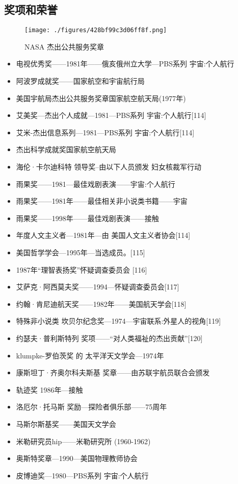 \subsection{奖项和荣誉}
\begin{figure}[ht]
\centering
\texttt{[image: ./figures/428bf99c3d06ff8f.png]}
\caption{NASA 杰出公共服务奖章} \label{fig_Sagan_11}
\end{figure}
\begin{itemize}
\item 电视优秀奖——1981年——俄亥俄州立大学—PBS系列 宇宙:个人航行
\item 阿波罗成就奖——国家航空和宇宙航行局
\item 美国宇航局杰出公共服务奖章国家航空航天局(1977年)
\item 艾美奖—杰出个人成就—1981—PBS系列 宇宙:个人航行[114]
\item 艾米-杰出信息系列—1981—PBS系列 宇宙:个人航行[114]
\item 杰出科学成就奖国家航空航天局
\item 海伦·卡尔迪科特 领导奖–由以下人员颁发 妇女核裁军行动
\item 雨果奖——1981—最佳戏剧表演——宇宙:个人航行
\item 雨果奖——1981年——最佳相关非小说类书籍——宇宙
\item 雨果奖——1998年——最佳戏剧表演——接触
\item 年度人文主义者—1981年—由 美国人文主义者协会[114]
\item 美国哲学学会—1995年—当选成员。[115]
\item 1987年“理智表扬奖”怀疑调查委员会 [116]
\item 艾萨克·阿西莫夫奖——1994—怀疑调查委员会[117]
\item 约翰·肯尼迪航天奖——1982年——美国航天学会[118]
\item 特殊非小说类 坎贝尔纪念奖—1974—宇宙联系:外星人的视角[119]
\item 约瑟夫·普利斯特列 奖项——“对人类福祉的杰出贡献”[120]
\item klumpke-罗伯茨奖 的 太平洋天文学会—1974年
\item 康斯坦丁·齐奥尔科夫斯基 奖章——由苏联宇航员联合会颁发
\item 轨迹奖 1986年—接触
\item 洛厄尔·托马斯 奖励—探险者俱乐部——75周年
\item 马斯尔斯基奖——美国天文学会
\item 米勒研究员hip——米勒研究所 (1960-1962)
\item 奥斯特奖章—1990—美国物理教师协会
\item 皮博迪奖—1980—PBS系列 宇宙:个人航行

\end{itemize}
